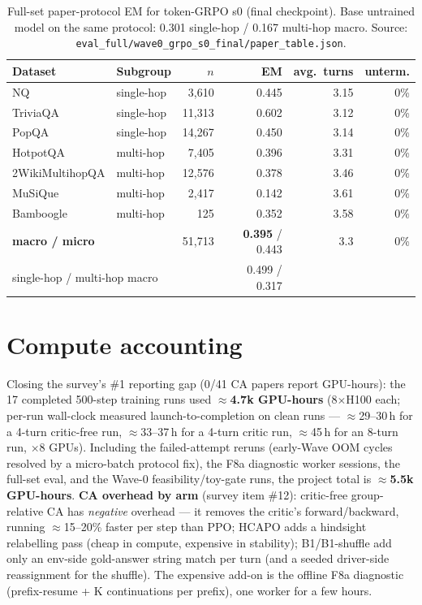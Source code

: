 \documentclass[11pt,a4paper]{article}
\begin{document}
\begin{table}[h]
\centering\small
\begin{tabular}{l l r r r r}
\toprule
Dataset & Subgroup & $n$ & EM & avg.\ turns & unterm. \\
\midrule
NQ              & single-hop & 3{,}610  & 0.445 & 3.15 & 0\% \\
TriviaQA        & single-hop & 11{,}313 & 0.602 & 3.12 & 0\% \\
PopQA           & single-hop & 14{,}267 & 0.450 & 3.14 & 0\% \\
HotpotQA        & multi-hop  & 7{,}405  & 0.396 & 3.31 & 0\% \\
2WikiMultihopQA & multi-hop  & 12{,}576 & 0.378 & 3.46 & 0\% \\
MuSiQue         & multi-hop  & 2{,}417  & 0.142 & 3.61 & 0\% \\
Bamboogle       & multi-hop  & 125      & 0.352 & 3.58 & 0\% \\
\midrule
\multicolumn{2}{l}{\textbf{macro / micro}} & 51{,}713 & \textbf{0.395} / 0.443 & 3.3 & 0\% \\
\multicolumn{2}{l}{single-hop / multi-hop macro} & & 0.499 / 0.317 & & \\
\bottomrule
\end{tabular}
\caption{Full-set paper-protocol EM for token-GRPO s0 (final checkpoint). Base untrained model on
the same protocol: 0.301 single-hop / 0.167 multi-hop macro. Source:
\texttt{eval\_full/wave0\_grpo\_s0\_final/paper\_table.json}.}
\label{tab:fullset}
\end{table}

\section{Compute accounting}
\label{sec:compute}

Closing the survey's \#1 reporting gap (0/41 CA papers report GPU-hours): the 17 completed
500-step training runs used \textbf{$\approx$4.7k GPU-hours} (8$\times$H100 each; per-run
wall-clock measured launch-to-completion on clean runs --- $\approx$29--30\,h for a 4-turn
critic-free run, $\approx$33--37\,h for a 4-turn critic run, $\approx$45\,h for an 8-turn run,
$\times$8 GPUs). Including the failed-attempt reruns (early-Wave OOM cycles resolved by a
micro-batch protocol fix), the F8a diagnostic worker sessions, the full-set eval, and the Wave-0
feasibility/toy-gate runs, the project total is \textbf{$\approx$5.5k GPU-hours}. \textbf{CA
overhead by arm} (survey item \#12): critic-free group-relative CA has \emph{negative} overhead
--- it removes the critic's forward/backward, running $\approx$15--20\% faster per step than PPO;
HCAPO adds a hindsight relabelling pass (cheap in compute, expensive in stability); B1/B1-shuffle
add only an env-side gold-answer string match per turn (and a seeded driver-side reassignment for
the shuffle). The expensive add-on is the offline F8a diagnostic (prefix-resume + K continuations
per prefix), one worker for a few hours.
\end{document}
